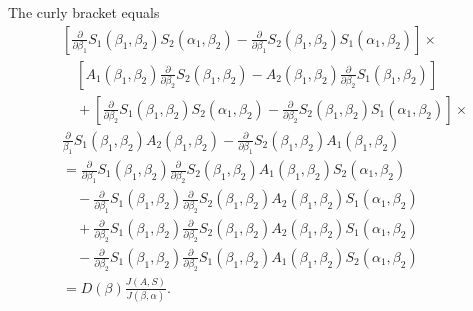 \begin{enumerate}[a)]
  The curly bracket equals
  \begin{align*}
  & \left[ \frac{\partial}{\partial \beta_1} S_1 (\beta_1,  \beta_2 )
    S_2 (\alpha_1,  \beta_2) - \frac{\partial}{\partial \beta_1} S_2
    (\beta_1,  \beta_2) S_1 (\alpha_1,  \beta_2) \right] \times \\ 
  & \quad \left[ A_1
    (\beta_1,  \beta_2) \frac{\partial}{\partial \beta_2} S_2
    (\beta_1,  \beta_2) - A_2 (\beta_1,  \beta_2)
    \frac{\partial}{\partial \beta_2} S_1 (\beta_1,  \beta_2) \right]\\ 
    & \quad + \left[ \frac{\partial}{\partial \beta_2} S_1 (\beta_1,
      \beta_2 ) S_2 (\alpha_1,  \beta_2 ) - \frac{\partial}{\partial
        \beta_2} S_2 (\beta_1,  \beta_2 ) S_1 (\alpha_1,  \beta_2 )
      \right]\times \\ 
    & \frac{\partial}{ \beta_1} S_1 (\beta_1,  \beta_2 ) A_2
    (\beta_1,  \beta_2 ) - \frac{\partial}{\partial  \beta_1} S_2
    (\beta_1,  \beta_2 ) A_1(\beta_1,  \beta_2 )\\ 
    & = \frac{\partial}{\partial \beta_1} S_1 (\beta_1,  \beta_2 )
    \frac{\partial}{\partial \beta_2} S_2 (\beta_1,  \beta_2 ) A_1
    (\beta_1,  \beta_2 ) S_2(\alpha_1,  \beta_2 )\\ 
    & \quad -  \frac{\partial}{\partial \beta_1} S_1 (\beta_1,  \beta_2 )
    \frac{\partial}{\partial \beta_2}S_2 (\beta_1,  \beta_2 ) A_2
    (\beta_1,  \beta_2 ) S_1(\alpha_1,  \beta_2 )\\ 
    & \quad + \frac{\partial}{\partial \beta_2} S_1 (\beta_1,  \beta_2 )
    \frac{\partial}{\partial \beta_2} S_2 (\beta_1,  \beta_2 ) A_2
    (\beta_1,  \beta_2 ) S_1(\alpha_1,  \beta_2 )\\ 
    & \quad - \frac{\partial}{\partial \beta_2} S_1 (\beta_1,  \beta_2 )
    \frac{\partial}{\partial \beta_2} S_1(\beta_1,  \beta_2 ) A_1
    (\beta_1,  \beta_2 ) S_2(\alpha_1,  \beta_2 )\\ 
    & = D(\beta ) \frac{J(A, S)} {J(\beta,  \alpha )}.
  \end{align*}
  

\end{enumerate}
